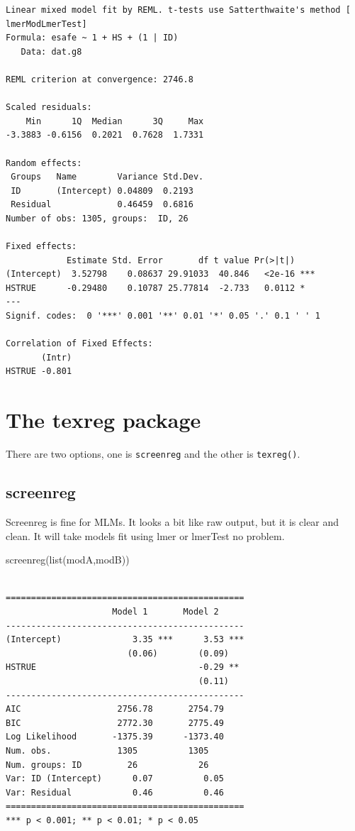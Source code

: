 \documentclass[
  letterpaper,
  DIV=11,
  numbers=noendperiod]{scrreprt}
\newenvironment{Shaded}{\begin{snugshade}}{\end{snugshade}}
\newcommand{\FunctionTok}[1]{\textcolor[rgb]{0.02,0.16,0.49}{#1}}
\newcommand{\NormalTok}[1]{\textcolor[rgb]{0.00,0.44,0.13}{#1}}
\begin{document}
\begin{verbatim}
Linear mixed model fit by REML. t-tests use Satterthwaite's method [
lmerModLmerTest]
Formula: esafe ~ 1 + HS + (1 | ID)
   Data: dat.g8

REML criterion at convergence: 2746.8

Scaled residuals: 
    Min      1Q  Median      3Q     Max 
-3.3883 -0.6156  0.2021  0.7628  1.7331 

Random effects:
 Groups   Name        Variance Std.Dev.
 ID       (Intercept) 0.04809  0.2193  
 Residual             0.46459  0.6816  
Number of obs: 1305, groups:  ID, 26

Fixed effects:
            Estimate Std. Error       df t value Pr(>|t|)    
(Intercept)  3.52798    0.08637 29.91033  40.846   <2e-16 ***
HSTRUE      -0.29480    0.10787 25.77814  -2.733   0.0112 *  
---
Signif. codes:  0 '***' 0.001 '**' 0.01 '*' 0.05 '.' 0.1 ' ' 1

Correlation of Fixed Effects:
       (Intr)
HSTRUE -0.801
\end{verbatim}

\hypertarget{the-texreg-package}{%
\section{The texreg package}\label{the-texreg-package}}

There are two options, one is \texttt{screenreg} and the other is
\texttt{texreg()}.

\hypertarget{screenreg}{%
\subsection{screenreg}\label{screenreg}}

Screenreg is fine for MLMs. It looks a bit like raw output, but it is
clear and clean. It will take models fit using lmer or lmerTest no
problem.

\begin{Shaded}
\begin{Highlighting}[]
\FunctionTok{screenreg}\NormalTok{(}\FunctionTok{list}\NormalTok{(modA,modB))}
\end{Highlighting}
\end{Shaded}

\begin{verbatim}

===============================================
                     Model 1       Model 2     
-----------------------------------------------
(Intercept)              3.35 ***      3.53 ***
                        (0.06)        (0.09)   
HSTRUE                                -0.29 ** 
                                      (0.11)   
-----------------------------------------------
AIC                   2756.78       2754.79    
BIC                   2772.30       2775.49    
Log Likelihood       -1375.39      -1373.40    
Num. obs.             1305          1305       
Num. groups: ID         26            26       
Var: ID (Intercept)      0.07          0.05    
Var: Residual            0.46          0.46    
===============================================
*** p < 0.001; ** p < 0.01; * p < 0.05
\end{verbatim}
\end{document}
